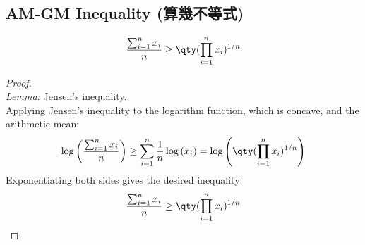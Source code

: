 \documentclass[a4paper,12pt]{article}
\begin{document}
\subsection{AM-GM Inequality (算幾不等式)}
\[ \frac{\sum_{i=1}^n x_i}{n} \geq \qty(\prod_{i=1}^n x_i)^{1/n} \]
\begin{proof}\mbox{}\\
\textit{Lemma:} Jensen's inequality.\\
Applying Jensen's inequality to the logarithm function, which is concave, and the arithmetic mean:
\[
\log \left(\frac{\sum_{i=1}^n x_i}{n}\right) \geq \sum_{i=1}^n \frac{1}{n} \log\left(x_i\right) = \log \left( \qty(\prod_{i=1}^n x_i)^{1/n} \right)
\]
Exponentiating both sides gives the desired inequality:
\[
\frac{\sum_{i=1}^n x_i}{n} \geq \qty(\prod_{i=1}^n x_i)^{1/n}
\]
\end{proof}
\end{document}
